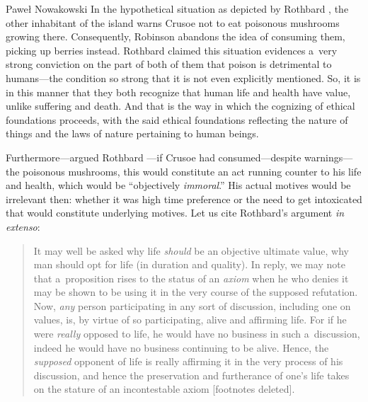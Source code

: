 \begin{artengenv}{Paweł Nowakowski}
In the hypothetical situation as depicted by Rothbard 
\parencite*[][p.32]{Rothbard1998Ethics}, %
 the other inhabitant of the island warns Crusoe not to eat poisonous mushrooms growing there. Consequently, Robinson abandons the idea of consuming them, picking up berries instead. Rothbard claimed this situation evidences a~very strong conviction on the part of both of them that poison is detrimental to humans---the condition so strong that it is not even explicitly mentioned. So, it is in this manner that they both recognize that human life and health have value, unlike suffering and death. And that is the way in which the cognizing of ethical foundations proceeds, with the said ethical foundations reflecting the nature of things and the laws of nature pertaining to human beings.



Furthermore---argued Rothbard 
\parencite*[][pp.32–33]{Rothbard1998Ethics}%
---if Crusoe had consumed---despite warnings---the poisonous mushrooms, this would constitute an act running counter to his life and health, which would be ``objectively \textit{immoral}.'' His actual motives would be irrelevant then: whether it was high time preference or the need to get intoxicated that would constitute underlying motives. Let us cite Rothbard's 
\parencite*[][pp.32–33]{Rothbard1998Ethics} %
 argument \textit{in extenso}:



\begin{quote}
It may well be asked why life \textit{should} be an objective ultimate value, why man should opt for life (in duration and quality). In reply, we may note that a~proposition rises to the status of an \textit{axiom} when he who denies it may be shown to be using it in the very course of the supposed refutation. Now, \textit{any} person participating in any sort of discussion, including one on values, is, by virtue of so participating, alive and affirming life. For if he were \textit{really} opposed to life, he would have no business in such a~discussion, indeed he would have no business continuing to be alive. Hence, the \textit{supposed} opponent of life is really affirming it in the very process of his discussion, and hence the preservation and furtherance of one's life takes on the stature of an incontestable axiom [footnotes deleted].
\end{quote}




\end{artengenv}
